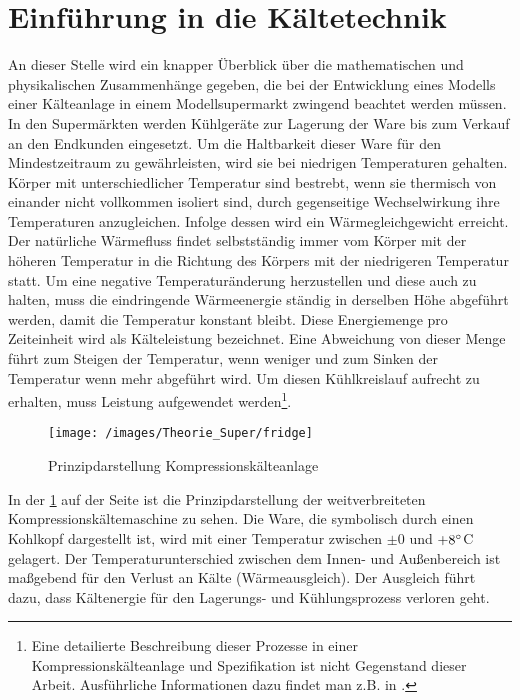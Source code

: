 
\section{Einf\"uhrung in die K\"altetechnik}

An dieser Stelle wird ein knapper \"Uberblick über die mathematischen und
physikalischen Zusammenhänge gegeben, die bei der Entwicklung eines Modells
einer K\"alteanlage in einem Modellsupermarkt zwingend beachtet werden müssen.\\

In den Superm\"arkten werden K\"uhlger\"ate zur Lagerung der Ware bis zum
Verkauf an den Endkunden eingesetzt. Um die Haltbarkeit dieser Ware f\"ur den
Mindestzeitraum zu gew\"ahrleisten, wird sie bei niedrigen Temperaturen
gehalten. Körper mit unterschiedlicher Temperatur sind bestrebt, wenn sie
thermisch von einander nicht vollkommen isoliert sind, durch gegenseitige
Wechselwirkung ihre Temperaturen anzugleichen. Infolge dessen wird ein
Wärmegleichgewicht erreicht. Der nat\"urliche W\"armefluss findet
selbstst\"andig immer vom K\"orper mit der h\"oheren Temperatur in die Richtung des
K\"orpers mit der niedrigeren Temperatur statt. Um eine negative
Temperaturänderung herzustellen und diese auch zu halten, muss die eindringende
Wärmeenergie ständig in derselben Höhe abgeführt werden, damit die Temperatur
konstant bleibt. Diese Energiemenge pro Zeiteinheit wird als Kälteleistung
bezeichnet. Eine Abweichung von dieser Menge führt zum Steigen der Temperatur,
wenn weniger und zum Sinken der Temperatur wenn mehr abgeführt wird. Um diesen
Kühlkreislauf aufrecht zu erhalten, muss Leistung aufgewendet werden\footnote{
	Eine detailierte Beschreibung dieser Prozesse in einer
	Kompressionskälteanlage und Spezifikation ist nicht Gegenstand dieser
	Arbeit.  Ausführliche Informationen dazu findet man z.B.  in \cite{caro,
	doctor, TAB_A1}.}.

\begin{figure}[h]
\begin{center}
\texttt{[image: /images/Theorie\_Super/fridge]}
\end{center}
\caption{Prinzipdarstellung Kompressionsk\"alteanlage}
\label{fig:prinz}
\end{figure}

In der \cref{fig:prinz} auf der Seite \pageref{fig:prinz} ist die
Prinzipdarstellung der weitverbreiteten Kompressionsk\"altemaschine zu sehen.
Die Ware, die symbolisch durch einen Kohlkopf dargestellt ist, wird mit einer
Temperatur zwischen $\pm 0$ und $+8^\circ$C gelagert. Der Temperaturunterschied
zwischen dem Innen- und Au\ss enbereich ist ma\ss gebend f\"ur den Verlust an
K\"alte (W\"armeausgleich).  Der Ausgleich f\"uhrt dazu, dass K\"altenergie
f\"ur den Lagerungs- und K\"uhlungsprozess verloren geht.

